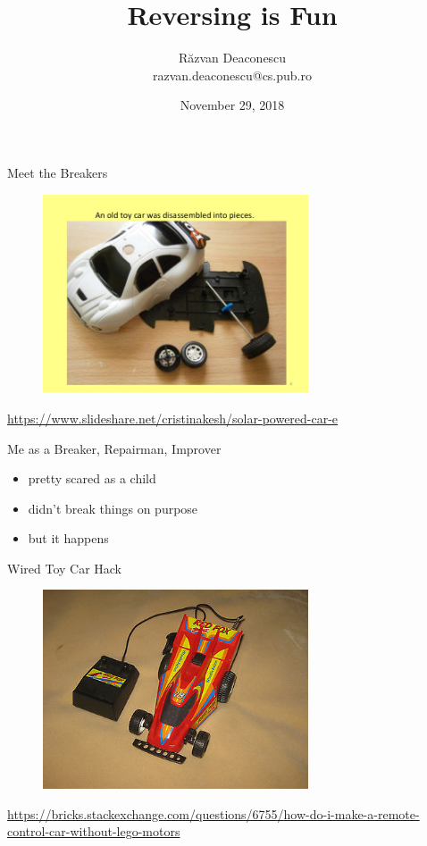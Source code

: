 \documentclass{simple}
\title[Reversing is Fun]{Reversing is Fun}
\institute{CompSoc, University of Leeds}
\author[Răzvan Deaconescu]{Răzvan Deaconescu \\
razvan.deaconescu@cs.pub.ro}
\date{November 29, 2018}
\begin{document}
\frame{\titlepage}

\begin{frame}{Meet the Breakers}
  \begin{figure}
    \centering
    \includegraphics[width=0.7\textwidth]{img/disassembled-toy-car}
  \end{figure}
  \begin{center}
    \tiny
    \url{https://www.slideshare.net/cristinakesh/solar-powered-car-e}
  \end{center}
\end{frame}

\begin{frame}{Me as a Breaker, Repairman, Improver}
  \begin{itemize}
    \pause \item pretty scared as a child
    \pause \item didn't break things on purpose
    \pause \item but it happens
  \end{itemize}
\end{frame}

\begin{frame}{Wired Toy Car Hack}
  \begin{figure}
    \centering
    \includegraphics[width=0.7\textwidth]{img/wired-toy-car}
  \end{figure}
  \begin{center}
    \tiny
    \url{https://bricks.stackexchange.com/questions/6755/how-do-i-make-a-remote-control-car-without-lego-motors}
  \end{center}
\end{frame}
\end{document}
